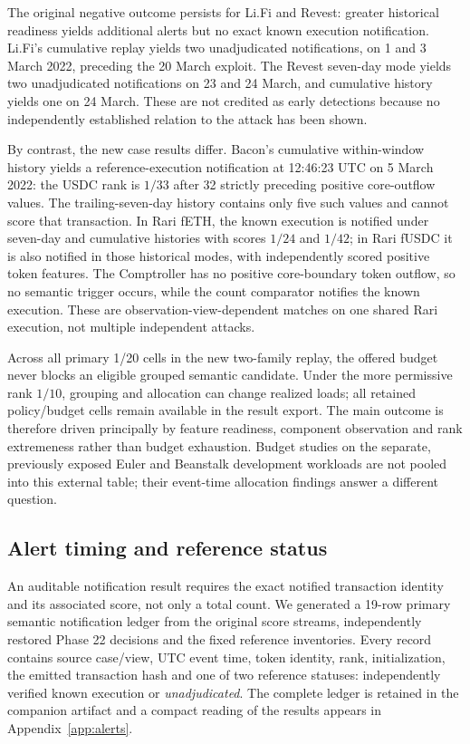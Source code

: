 \documentclass[preprint,12pt,authoryear]{elsarticle}
\begin{document}
The original negative outcome persists for Li.Fi and Revest: greater historical readiness yields additional alerts but no exact known execution notification. Li.Fi's cumulative replay yields two unadjudicated notifications, on 1 and 3 March 2022, preceding the 20 March exploit. The Revest seven-day mode yields two unadjudicated notifications on 23 and 24 March, and cumulative history yields one on 24 March. These are not credited as early detections because no independently established relation to the attack has been shown.

By contrast, the new case results differ. Bacon's cumulative within-window history yields a reference-execution notification at 12:46:23 UTC on 5 March 2022: the USDC rank is $1/33$ after 32 strictly preceding positive core-outflow values. The trailing-seven-day history contains only five such values and cannot score that transaction. In Rari fETH, the known execution is notified under seven-day and cumulative histories with scores $1/24$ and $1/42$; in Rari fUSDC it is also notified in those historical modes, with independently scored positive token features. The Comptroller has no positive core-boundary token outflow, so no semantic trigger occurs, while the count comparator notifies the known execution. These are observation-view-dependent matches on one shared Rari execution, not multiple independent attacks.

Across all primary 1/20 cells in the new two-family replay, the offered budget never blocks an eligible grouped semantic candidate. Under the more permissive rank $1/10$, grouping and allocation can change realized loads; all retained policy/budget cells remain available in the result export. The main outcome is therefore driven principally by feature readiness, component observation and rank extremeness rather than budget exhaustion. Budget studies on the separate, previously exposed Euler and Beanstalk development workloads are not pooled into this external table; their event-time allocation findings answer a different question.

\subsection{Alert timing and reference status}
An auditable notification result requires the exact notified transaction identity and its associated score, not only a total count. We generated a 19-row primary semantic notification ledger from the original score streams, independently restored Phase 22 decisions and the fixed reference inventories. Every record contains source case/view, UTC event time, token identity, rank, initialization, the emitted transaction hash and one of two reference statuses: independently verified known execution or \emph{unadjudicated}. The complete ledger is retained in the companion artifact and a compact reading of the results appears in Appendix~\ref{app:alerts}.
\end{document}
